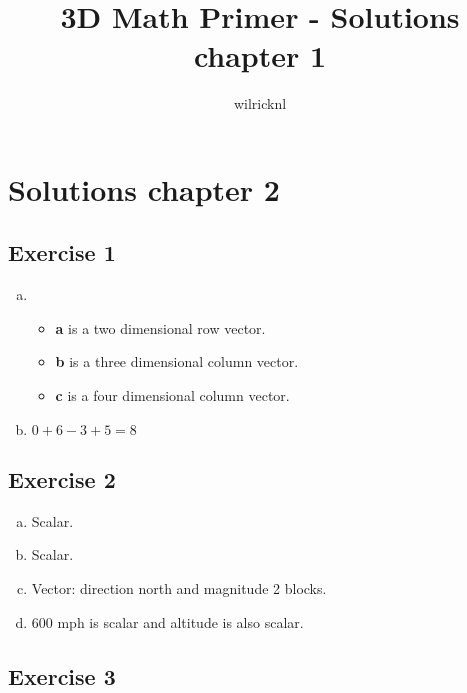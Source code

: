 \documentclass[11pt]{article}
\author{wilricknl}
\title{3D Math Primer - Solutions chapter 1}
\begin{document}
\maketitle

\section{Solutions chapter 2}

\subsection{Exercise 1}

\begin{enumerate}[a.]
    \item
    \begin{itemize}
        \item \textbf{a} is a two dimensional row vector.
        \item \textbf{b} is a three dimensional column vector.
        \item \textbf{c} is a four dimensional column vector.
    \end{itemize}
    \item $0 + 6 - 3 + 5 = 8$
\end{enumerate}

\subsection{Exercise 2}

\begin{enumerate}[a.]
	\item Scalar.
	\item Scalar.
	\item Vector: direction north and magnitude 2 blocks.
	\item 600 mph is scalar and altitude is also scalar.
\end{enumerate}


\subsection{Exercise 3}
\end{document}
